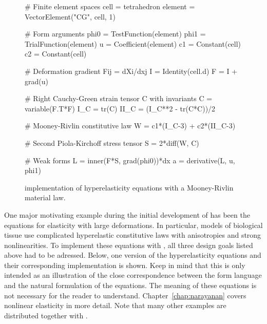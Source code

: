\begin{figure}\label{ufl:fig:hypcode}
\begin{python}
# Finite element spaces
cell = tetrahedron
element = VectorElement("CG", cell, 1)

# Form arguments
phi0 = TestFunction(element)
phi1 = TrialFunction(element)
u = Coefficient(element)
c1 = Constant(cell)
c2 = Constant(cell)

# Deformation gradient Fij = dXi/dxj
I = Identity(cell.d)
F = I + grad(u)

# Right Cauchy-Green strain tensor C with invariants
C = variable(F.T*F)
I_C = tr(C)
II_C = (I_C**2 - tr(C*C))/2

# Mooney-Rivlin constitutive law
W = c1*(I_C-3) + c2*(II_C-3)

# Second Piola-Kirchoff stress tensor
S = 2*diff(W, C)

# Weak forms
L = inner(F*S, grad(phi0))*dx
a = derivative(L, u, phi1)
\end{python}
\caption{\ufl{} implementation of hyperelasticity equations with a
Mooney-Rivlin material law.}
\end{figure}

One major motivating example during the initial development of \ufl{}
has been the equations for elasticity with large deformations.  In
particular, models of biological tissue use complicated hyperelastic
constitutive laws with anisotropies and strong nonlinearities.  To
implement these equations with \fenics{}, all three design goals
listed above had to be adressed.  Below, one version of the
hyperelasticity equations and their corresponding \ufl{}
implementation is shown.  Keep in mind that this is only intended as
an illustration of the close correspondence between the form language
and the natural formulation of the equations.  The meaning of
these equations is not necessary for the reader to understand.
Chapter~\ref{chap:narayanan} covers nonlinear elasticity in more detail.
Note that many other examples are distributed together with \ufl{}.

